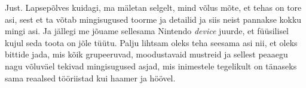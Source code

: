 
Just. Lapsepõlves kuidagi, ma mäletan selgelt, mind võlus mõte, et tehas on tore asi, sest et ta võtab mingisugused toorme ja detailid ja siis neist pannakse kokku mingi asi. Ja jällegi me jõuame sellesama  Nintendo \emph{device} juurde, et füüsilisel kujul seda toota on jõle tüütu. Palju lihtsam oleks teha seesama asi nii, et oleks bittide jada, mis kõik grupeeruvad, moodustavaid mustreid ja sellest peaaegu nagu võluväel tekivad mingisugused asjad, mis inimestele tegelikult on tänaseks sama reaalsed tööriistad kui haamer ja höövel.
